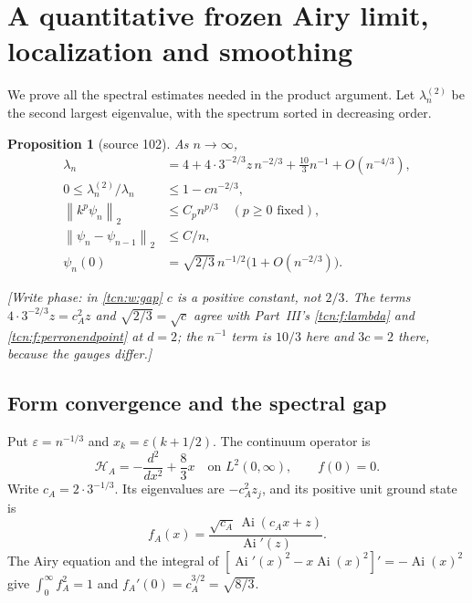 \documentclass[11pt,letterpaper]{article}
\newcommand{\Ai}{\operatorname{Ai}}
\newcommand{\norm}[1]{\left\lVert#1\right\rVert}
\newcommand{\eps}{\varepsilon}
\newtheorem{proposition}[theorem]{Proposition}
\theoremstyle{remark}
\begin{document}
\section{A quantitative frozen Airy limit, localization and smoothing}\label{tcn:w:sec:spectral}
We prove all the spectral estimates needed in the product argument. Let $\lambda_n^{(2)}$ be the second largest eigenvalue, with the spectrum sorted in decreasing order.
\begin{proposition}[source 102]\label{tcn:w:prop:spectral}
As $n\to\infty$,
\begin{align}
 \lambda_n&=4+4\cdot3^{-2/3}z\,n^{-2/3}+\frac{10}{3}n^{-1}
                 +O(n^{-4/3}),\label{tcn:w:lambda}\\
 0\le\lambda_n^{(2)}/\lambda_n&\le1-cn^{-2/3},\label{tcn:w:gap}\\
 \norm{k^p\psi_n}_2&\le C_pn^{p/3}\quad(p\ge0\text{ fixed}),\label{tcn:w:moments}\\
 \norm{\psi_n-\psi_{n-1}}_2&\le C/n,\label{tcn:w:drift}\\
 \psi_n(0)&=\sqrt{2/3}\,n^{-1/2}\bigl(1+O(n^{-2/3})\bigr).\label{tcn:w:endpointphi}
\end{align}
\end{proposition}
\emph{[Write phase: in \eqref{tcn:w:gap} $c$ is a positive constant, not $2/3$. The terms $4\cdot3^{-2/3}z=c_A^2z$ and $\sqrt{2/3}=\sqrt c$ agree with Part~III's \eqref{tcn:f:lambda} and \eqref{tcn:f:perronendpoint} at $d=2$; the $n^{-1}$ term is $10/3$ here and $3c=2$ there, because the gauges differ.]}

\subsection{Form convergence and the spectral gap}
Put $\eps=n^{-1/3}$ and $x_k=\eps(k+1/2)$. The continuum operator is
\[
 \mathcal H_A=-\frac{d^2}{dx^2}+\frac83x
 \quad\text{on }L^2(0,\infty),\qquad f(0)=0.
\]
Write $c_A=2\cdot3^{-1/3}$. Its eigenvalues are $-c_A^2z_j$, and its positive unit ground state is
\begin{equation}\label{tcn:w:airyf}
 f_A(x)=\frac{\sqrt{c_A}\,\Ai(c_Ax+z)}{\Ai'(z)}.
\end{equation}
The Airy equation and the integral of $[\Ai'(x)^2-x\Ai(x)^2]'=-\Ai(x)^2$ give $\int_0^\infty f_A^2=1$ and $f_A'(0)=c_A^{3/2}=\sqrt{8/3}$.
\end{document}
